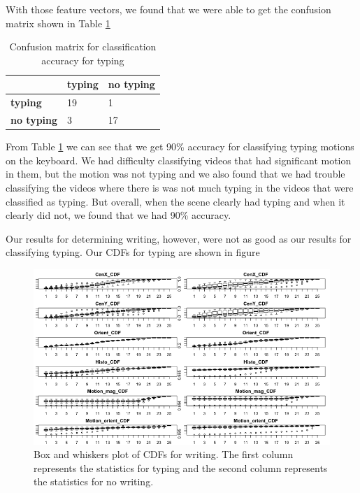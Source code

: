 With those feature vectors, we found that we were able to get the confusion matrix
shown in Table \ref{table:typing_confusion}
\begin{table}[h]
  \begin{centering}
  \label{table:typing_confusion}
  \begin{tabular}{| l | l | l |}
  \hline
   & \textbf{typing} & \textbf{no typing}\\ \hline
  \textbf{typing} & 19 & 1 \\ \hline
  \textbf{no typing} & 3 & 17 \\ \hline
  \end{tabular}
  \caption{Confusion matrix for classification accuracy for typing}
\end{centering}
\end{table}

\FloatBarrier

From Table \ref{table:typing_confusion} we can see that we get 90\% accuracy for
classifying typing motions on the keyboard. We had difficulty classifying
videos that had significant motion in them, but the motion was not typing and
we also found that we had trouble classifying the videos where there is was
not much typing in the videos that were classified as typing. But overall, when the
scene clearly had typing and when it clearly did not, we found that we had
90\% accuracy.

Our results for determining writing, however, were not as good as our results
for classifying typing. Our CDFs for typing are shown in figure

\begin{figure}[h]
  \label{fig:typing_box_whiskers}
  \centering
  \includegraphics[width=\textwidth]{figures/writing_cdfs}
  \caption{Box and whiskers plot of CDFs for writing. The first column represents the
  statistics for typing and the second column represents the statistics for no
  writing.}
\end{figure}

